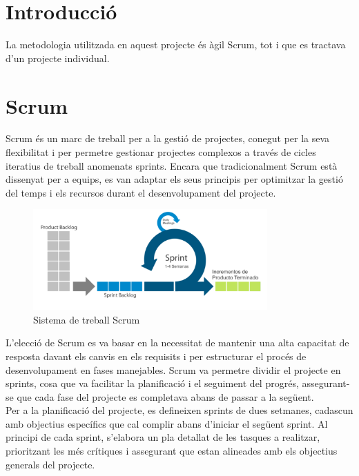 \documentclass[a4paper,12pt,twoside]{ThesisStyle}
\begin{document}
\section{Introducció}
\label{subsec: Introducció}

La metodologia utilitzada en aquest projecte és àgil Scrum, tot i que es tractava d'un projecte individual. 

\section{Scrum}
\label{subsec: Scrum}

Scrum és un marc de treball per a la gestió de projectes, conegut per la seva flexibilitat i per permetre gestionar projectes complexos a través de cicles iteratius de treball anomenats sprints. Encara que tradicionalment Scrum està dissenyat per a equips, es van adaptar els seus principis per optimitzar la gestió del temps i els recursos durant el desenvolupament del projecte.\\

\begin{figure}[h!] %
  \centering
  \includegraphics[width=0.8\textwidth]{imatges/scrum.png} %
  \caption{Sistema de treball Scrum} %
  \label{fig:Sistema de treball Scrum} %
\end{figure}

L'elecció de Scrum es va basar en la necessitat de mantenir una alta capacitat de resposta davant els canvis en els requisits i per estructurar el procés de desenvolupament en fases manejables. Scrum va permetre dividir el projecte en sprints, cosa que va facilitar la planificació i el seguiment del progrés, assegurant-se que cada fase del projecte es completava abans de passar a la següent.\\

Per a la planificació del projecte, es defineixen sprints de dues setmanes, cadascun amb objectius específics que cal complir abans d’iniciar el següent sprint. Al principi de cada sprint, s’elabora un pla detallat de les tasques a realitzar, prioritzant les més crítiques i assegurant que estan alineades amb els objectius generals del projecte.\\
\end{document}
